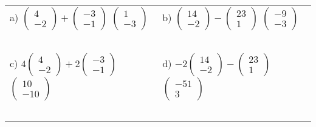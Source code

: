 \documentclass[fontsize=12pt]{scrartcl}
\begin{document}
\begin{tabular}{p{9cm}p{9cm}}
a) $\begin{pmatrix}4\\-2 \end{pmatrix} + \begin{pmatrix}-3\\-1 \end{pmatrix}$
 \quad $\begin{pmatrix}1\\-3 \end{pmatrix}$
&b) $\begin{pmatrix}14\\-2 \end{pmatrix} - \begin{pmatrix}23\\1 \end{pmatrix}$
 \quad $\begin{pmatrix}-9\\-3 \end{pmatrix}$
\\\\\\
\\\\\\

c) $4\begin{pmatrix}4\\-2 \end{pmatrix} + 2\begin{pmatrix}-3\\-1 \end{pmatrix}$
 \quad $\begin{pmatrix}10\\-10 \end{pmatrix}$
&d) $-2\begin{pmatrix}14\\-2 \end{pmatrix} - \begin{pmatrix}23\\1 \end{pmatrix}$
 \quad $\begin{pmatrix}-51\\3 \end{pmatrix}$
\\\\\\
\\\\\\


\end{tabular}
\end{document}
